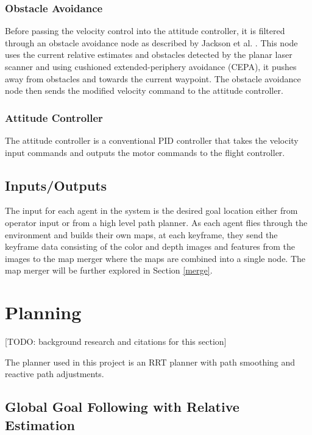 \documentclass[letterpaper, 10 pt, conference]{ieeeconf}  %
\newcommand{\todo}[1]{{\color{blue}[TODO: #1]}}
\begin{document}
\subsubsection{Obstacle Avoidance}

Before passing the velocity control into the attitude controller, it is filtered through an obstacle avoidance node as described by Jackson et al. \cite{Jackson2016}. This node uses the current relative estimates and obstacles detected by the planar laser scanner and using cushioned extended-periphery avoidance (CEPA), it pushes away from obstacles and towards the current waypoint. The obstacle avoidance node then sends the modified velocity command to the attitude controller.

\subsubsection{Attitude Controller}

The attitude controller is a conventional PID controller that takes the velocity input commands and outputs the motor commands to the flight controller.

\subsection{Inputs/Outputs}

The input for each agent in the system is the desired goal location either from operator input or from a high level path planner. As each agent flies through the environment and builds their own maps, at each keyframe, they send the keyframe data consisting of the color and depth images and features from the images to the map merger where the maps are combined into a single node. The map merger will be further explored in Section \ref{merge}.

\section{Planning}\label{planning}

\todo{background research and citations for this section}

The planner used in this project is an RRT planner with path smoothing and reactive path adjustments.

\subsection{Global Goal Following with Relative Estimation}
\end{document}

